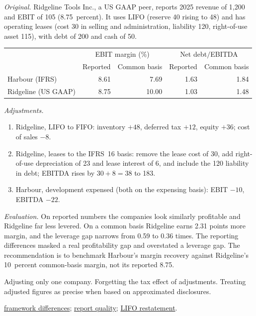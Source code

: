 \begin{qfmethod}
 \emph{Original.} Ridgeline Tools Inc., a US GAAP peer, reports 2025 revenue of 1{,}200 and EBIT of 105 (8.75~percent). It uses LIFO (reserve 40 rising to 48) and has operating leases (cost 30 in selling and administration, liability 120, right-of-use asset 115), with debt of 200 and cash of 50.

\begin{center}\small
\begin{tabular}{@{}lrrrr@{}}
\toprule
 & \multicolumn{2}{c}{EBIT margin (\%)} & \multicolumn{2}{c}{Net debt$/$EBITDA}\\
 & Reported & Common basis & Reported & Common basis\\
\midrule
Harbour (IFRS) & 8.61 & 7.69 & 1.63 & 1.84\\
Ridgeline (US GAAP) & 8.75 & 10.00 & 1.03 & 1.48\\
\bottomrule
\end{tabular}
\end{center}

\emph{Adjustments.}
\begin{enumerate}
\item Ridgeline, LIFO to FIFO: inventory $+48$, deferred tax $+12$, equity $+36$; cost of sales $-8$.
\item Ridgeline, leases to the IFRS~16 basis: remove the lease cost of 30, add right-of-use depreciation of 23 and lease interest of 6, and include the 120 liability in debt; EBITDA rises by $30+8=38$ to 183.
\item Harbour, development expensed (both on the expensing basis): EBIT $-10$, EBITDA $-22$.
\end{enumerate}

\emph{Evaluation.} On reported numbers the companies look similarly profitable and Ridgeline far less levered. On a common basis Ridgeline earns 2.31 points more margin, and the leverage gap narrows from 0.59 to 0.36 times. The reporting differences masked a real profitability gap and overstated a leverage gap. The recommendation is to benchmark Harbour's margin recovery against Ridgeline's 10~percent common-basis margin, not its reported 8.75.

 Adjusting only one company. Forgetting the tax effect of adjustments. Treating adjusted figures as precise when based on approximated disclosures.

 \hyperref[def:ifrs-us-gaap-reporting-systems]{framework differences}; \hyperref[meth:report-quality-evaluation]{report quality}; \hyperref[meth:inventory-cost-formulas]{LIFO restatement}.

\end{qfmethod}

